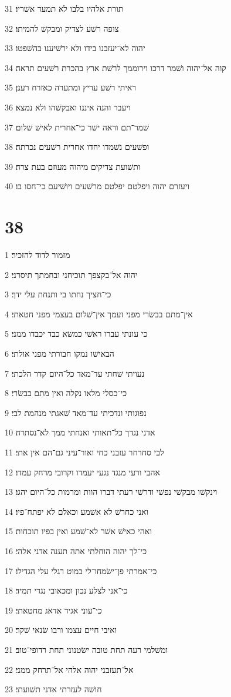 \par 31 תורת אלהיו בלבו לא תמעד אשׁריו׃
\par 32 צופה רשׁע לצדיק ומבקשׁ להמיתו׃
\par 33 יהוה לא־יעזבנו בידו ולא ירשׁיענו בהשׁפטו׃
\par 34 קוה אל־יהוה ושׁמר דרכו וירוממך לרשׁת ארץ בהכרת רשׁעים תראה׃
\par 35 ראיתי רשׁע עריץ ומתערה כאזרח רענן׃
\par 36 ויעבר והנה איננו ואבקשׁהו ולא נמצא׃
\par 37 שׁמר־תם וראה ישׁר כי־אחרית לאישׁ שׁלום׃
\par 38 ופשׁעים נשׁמדו יחדו אחרית רשׁעים נכרתה׃
\par 39 ותשׁועת צדיקים מיהוה מעוזם בעת צרה׃
\par 40 ויעזרם יהוה ויפלטם יפלטם מרשׁעים ויושׁיעם כי־חסו בו׃

\chapter{38}

\par 1 מזמור לדוד להזכיר׃
\par 2 יהוה אל־בקצפך תוכיחני ובחמתך תיסרני׃
\par 3 כי־חציך נחתו בי ותנחת עלי ידך׃
\par 4 אין־מתם בבשׂרי מפני זעמך אין־שׁלום בעצמי מפני חטאתי׃
\par 5 כי עונתי עברו ראשׁי כמשׂא כבד יכבדו ממני׃
\par 6 הבאישׁו נמקו חבורתי מפני אולתי׃
\par 7 נעויתי שׁחתי עד־מאד כל־היום קדר הלכתי׃
\par 8 כי־כסלי מלאו נקלה ואין מתם בבשׂרי׃
\par 9 נפוגותי ונדכיתי עד־מאד שׁאגתי מנהמת לבי׃
\par 10 אדני נגדך כל־תאותי ואנחתי ממך לא־נסתרה׃
\par 11 לבי סחרחר עזבני כחי ואור־עיני גם־הם אין אתי׃
\par 12 אהבי ורעי מנגד נגעי יעמדו וקרובי מרחק עמדו׃
\par 13 וינקשׁו מבקשׁי נפשׁי ודרשׁי רעתי דברו הוות ומרמות כל־היום יהגו׃
\par 14 ואני כחרשׁ לא אשׁמע וכאלם לא יפתח־פיו׃
\par 15 ואהי כאישׁ אשׁר לא־שׁמע ואין בפיו תוכחות׃
\par 16 כי־לך יהוה הוחלתי אתה תענה אדני אלהי׃
\par 17 כי־אמרתי פן־ישׂמחו־לי במוט רגלי עלי הגדילו׃
\par 18 כי־אני לצלע נכון ומכאובי נגדי תמיד׃
\par 19 כי־עוני אגיד אדאג מחטאתי׃
\par 20 ואיבי חיים עצמו ורבו שׂנאי שׁקר׃
\par 21 ומשׁלמי רעה תחת טובה ישׂטנוני תחת רדופי־טוב׃
\par 22 אל־תעזבני יהוה אלהי אל־תרחק ממני׃
\par 23 חושׁה לעזרתי אדני תשׁועתי׃

